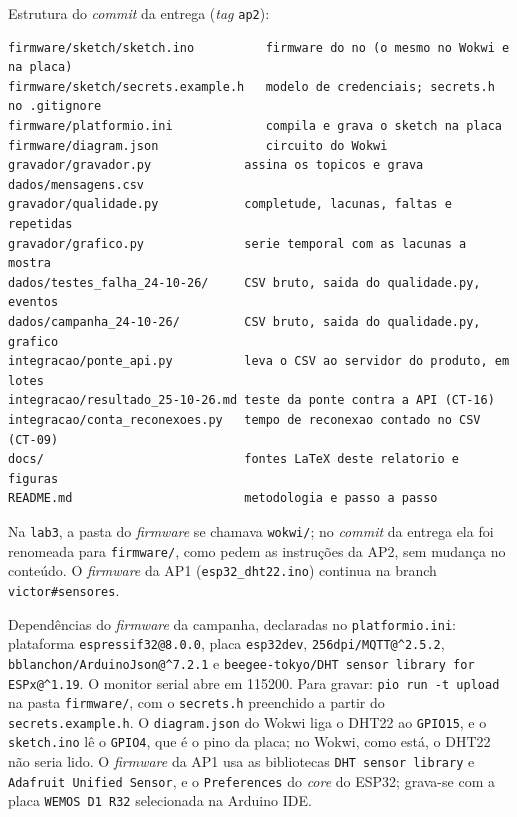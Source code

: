\medskip
\noindent Estrutura do \emph{commit} da entrega (\emph{tag} \texttt{ap2}):

\begin{lstlisting}[style=terminal]
firmware/sketch/sketch.ino          firmware do no (o mesmo no Wokwi e na placa)
firmware/sketch/secrets.example.h   modelo de credenciais; secrets.h no .gitignore
firmware/platformio.ini             compila e grava o sketch na placa
firmware/diagram.json               circuito do Wokwi
gravador/gravador.py             assina os topicos e grava dados/mensagens.csv
gravador/qualidade.py            completude, lacunas, faltas e repetidas
gravador/grafico.py              serie temporal com as lacunas a mostra
dados/testes_falha_24-10-26/     CSV bruto, saida do qualidade.py, eventos
dados/campanha_24-10-26/         CSV bruto, saida do qualidade.py, grafico
integracao/ponte_api.py          leva o CSV ao servidor do produto, em lotes
integracao/resultado_25-10-26.md teste da ponte contra a API (CT-16)
integracao/conta_reconexoes.py   tempo de reconexao contado no CSV (CT-09)
docs/                            fontes LaTeX deste relatorio e figuras
README.md                        metodologia e passo a passo
\end{lstlisting}

\noindent Na \texttt{lab3}, a pasta do \emph{firmware} se chamava
\texttt{wokwi/}; no \emph{commit} da entrega ela foi renomeada para
\texttt{firmware/}, como pedem as instruções da AP2, sem mudança no
conteúdo. O \emph{firmware} da AP1 (\texttt{esp32\_dht22.ino}) continua
na branch \texttt{victor\#sensores}.

\noindent Dependências do \emph{firmware} da campanha, declaradas no
\texttt{platformio.ini}: plataforma \texttt{espressif32@8.0.0}, placa
\texttt{esp32dev}, \texttt{256dpi/MQTT@\^{}2.5.2},
\texttt{bblanchon/ArduinoJson@\^{}7.2.1} e
\texttt{beegee-tokyo/DHT sensor library for ESPx@\^{}1.19}. O monitor
serial abre em \SI{115200}{\baud}. Para gravar: \texttt{pio run -t
upload} na pasta \texttt{firmware/}, com o \texttt{secrets.h} preenchido a
partir do \texttt{secrets.example.h}. O \texttt{diagram.json} do Wokwi
liga o DHT22 ao \texttt{GPIO15}, e o \texttt{sketch.ino} lê o
\texttt{GPIO4}, que é o pino da placa; no Wokwi, como está, o DHT22 não
seria lido. O \emph{firmware} da AP1 usa as bibliotecas \texttt{DHT
sensor library} e \texttt{Adafruit Unified Sensor}, e o
\texttt{Preferences} do \emph{core} do ESP32; grava-se com a placa
\texttt{WEMOS D1 R32} selecionada na Arduino IDE.
